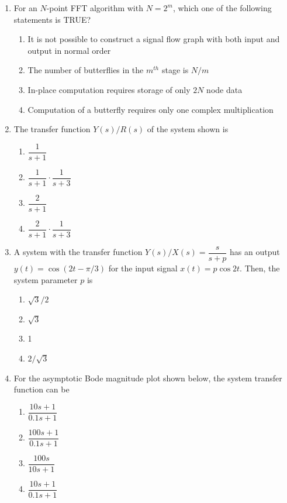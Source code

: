 \documentclass[journal,12pt,onecolumn]{IEEEtran}
\begin{document}
\begin{enumerate}
\item For an $N$-point FFT algorithm with $N=2^m$, which one of the following statements is TRUE?
\begin{multicols}{2}
\begin{enumerate}
\item It is not possible to construct a signal flow graph with both input and output in normal order
\item The number of butterflies in the $m^{th}$ stage is $N/m$
\item In-place computation requires storage of only $2N$ node data
\item Computation of a butterfly requires only one complex multiplication
\end{enumerate}
\end{multicols}

\item The transfer function $Y(s)/R(s)$ of the system shown is
\begin{multicols}{2}
\begin{enumerate}
\item $\dfrac{1}{s+1}$
\item $\dfrac{1}{s+1}\cdot\dfrac{1}{s+3}$
\item $\dfrac{2}{s+1}$
\item $\dfrac{2}{s+1}\cdot\dfrac{1}{s+3}$
\end{enumerate}
\end{multicols}

\item A system with the transfer function $Y(s)/X(s)=\dfrac{s}{s+p}$ has an output $y(t)=\cos(2t-\pi/3)$ for the input signal $x(t)=p\cos 2t$. Then, the system parameter $p$ is
\begin{multicols}{2}
\begin{enumerate}
\item $\sqrt{3}/2$
\item $\sqrt{3}$
\item 1
\item $2/\sqrt{3}$
\end{enumerate}
\end{multicols}

\item For the asymptotic Bode magnitude plot shown below, the system transfer function can be
\begin{multicols}{2}
\begin{enumerate}
\item $\dfrac{10s+1}{0.1s+1}$
\item $\dfrac{100s+1}{0.1s+1}$
\item $\dfrac{100s}{10s+1}$
\item $\dfrac{10s+1}{0.1s+1}$
\end{enumerate}
\end{multicols}


\end{enumerate}
\end{document}
